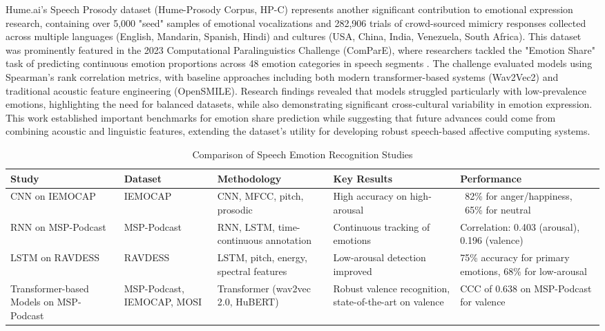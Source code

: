 \par Hume.ai's Speech Prosody dataset (Hume-Prosody Corpus, HP-C) represents another significant contribution to emotional expression research, containing over 5,000 "seed" samples of emotional vocalizations and 282,906 trials of crowd-sourced mimicry responses collected across multiple languages (English, Mandarin, Spanish, Hindi) and cultures (USA, China, India, Venezuela, South Africa). This dataset was prominently featured in the 2023 Computational Paralinguistics Challenge (ComParE), where researchers tackled the "Emotion Share" task of predicting continuous emotion proportions across 48 emotion categories in speech segments \cite{schuller2023acm}. The challenge evaluated models using Spearman's rank correlation metrics, with baseline approaches including both modern transformer-based systems (Wav2Vec2) and traditional acoustic feature engineering (OpenSMILE). Research findings revealed that models struggled particularly with low-prevalence emotions, highlighting the need for balanced datasets, while also demonstrating significant cross-cultural variability in emotion expression. This work established important benchmarks for emotion share prediction while suggesting that future advances could come from combining acoustic and linguistic features, extending the dataset's utility for developing robust speech-based affective computing systems.


\begin{table}[h!]
\centering
\begin{tabularx}{\textwidth}{|X|X|X|X|X|}
\hline
\textbf{Study} & \textbf{Dataset} & \textbf{Methodology} & \textbf{Key Results} & \textbf{Performance} \\
\hline
CNN on IEMOCAP & IEMOCAP & CNN, MFCC, pitch, prosodic & High accuracy on high-arousal & ~82\% for anger/happiness, ~65\% for neutral \\
\hline
RNN on MSP-Podcast & MSP-Podcast & RNN, LSTM, time-continuous annotation & Continuous tracking of emotions & Correlation: 0.403 (arousal), 0.196 (valence) \\
\hline
LSTM on RAVDESS & RAVDESS & LSTM, pitch, energy, spectral features & Low-arousal detection improved & 75\% accuracy for primary emotions, 68\% for low-arousal \\
\hline
Transformer-based Models on MSP-Podcast & MSP-Podcast, IEMOCAP, MOSI & Transformer (wav2vec 2.0, HuBERT) & Robust valence recognition, state-of-the-art on valence & CCC of 0.638 on MSP-Podcast for valence \\
\hline
\end{tabularx}
\caption{Comparison of Speech Emotion Recognition Studies}
\end{table}

